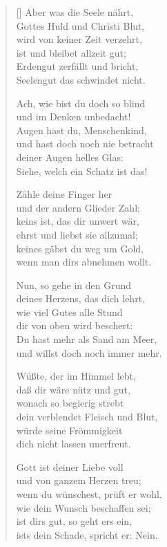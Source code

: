 \begin{multicols}{2}
\begin{verse}[\versewidth]
 Aber was die Seele nährt,\\
Gottes Huld und Christi Blut,\\
wird von keiner Zeit verzehrt,\\
ist und bleibet allzeit gut;\\
Erdengut zerfällt und bricht,\\
Seelengut das schwindet nicht.

 Ach, wie bist du doch so blind\\
und im Denken unbedacht!\\
Augen hast du, Menschenkind,\\
und hast doch noch nie betracht\\
deiner Augen helles Glas:\\
Siehe, welch ein Schatz ist das!

 Zähle deine Finger her\\
und der andern Glieder Zahl;\\
keins ist, das dir unwert wär,\\
ehrst und liebst sie allzumal;\\
keines gäbst du weg um Gold,\\
wenn man dirs abnehmen wollt.

 Nun, so gehe in den Grund\\
deines Herzens, das dich lehrt,\\
wie viel Gutes alle Stund\\
dir von oben wird beschert:\\
Du hast mehr als Sand am Meer,\\
und willst doch noch immer mehr.

 Wüßte, der im Himmel lebt,\\
daß dir wäre nütz und gut,\\
wonach so begierig strebt\\
dein verblendet Fleisch und Blut,\\
würde seine Frömmigkeit\\
dich nicht lassen unerfreut.

 Gott ist deiner Liebe voll\\
und von ganzem Herzen treu;\\
wenn du wünschest, prüft er wohl,\\
wie dein Wunsch beschaffen sei;\\
ist dirs gut, so geht ers ein,\\
ists dein Schade, spricht er: Nein.


\end{verse}
\end{multicols}
